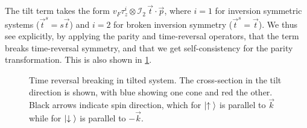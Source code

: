 The tilt term takes the form \(v_F \tau_z^i \otimes \mathcal{I}_{2} \, \vec{t} \cdot \vec{p} \), where \( i=1 \) for inversion symmetric systems (\( \vec{t}^s = s \vec{t} \)) and \( i=2 \) for broken inversion symmetry (\( \vec{t}^s = \vec{t} \)).
We thus see explicitly, by applying the parity and time-reversal operators, that the term breaks time-reversal symmetry, and that we get self-consistency for the parity transformation.
This is also shown in \cref{fig:spin-struct-tilt}.

\begin{figure}[h]
  \centering
  \caption{Time reversal breaking in tilted system.
    The cross-section in the tilt direction is shown, with blue showing one cone and red the other.
    Black arrows indicate spin direction, which for \(\ket{\uparrow {}}\) is parallel to  \(\vec{k}\) while for \(\ket{\downarrow {}}\) is parallel to \( -\vec{k} \).
    \label{fig:spin-struct-tilt}
  }
\end{figure}

